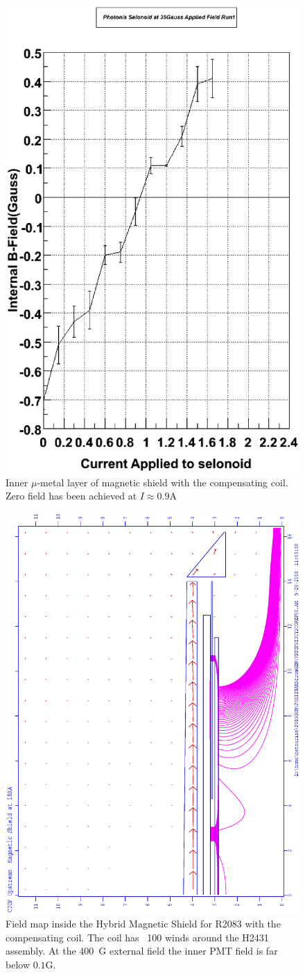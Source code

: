 \documentclass[12pt]{article}
\begin{document}
\begin{figure}
\centering
\includegraphics[width=.6\textwidth]{35_gauss_run1.eps}
\caption{\small{Inner $\mu$-metal layer of  magnetic shield 
with the compensating coil. Zero  field has been  achieved at $I\approx0.9$A}}
\label{mumedysh}
\end{figure}
\begin{figure}[htbp]
\centering
\includegraphics[width=.6\textwidth]{VBTUPST3CY1COREF0001.eps}
\caption{\small{ Field map inside the Hybrid Magnetic Shield for R2083
with the compensating coil. The coil has ~100 winds around  the H2431 assembly.
At   the 400~G external field the inner PMT field  is far  below $0.1$G.}}
\label{VBT3CYUS1}
\end{figure}
\end{document}
